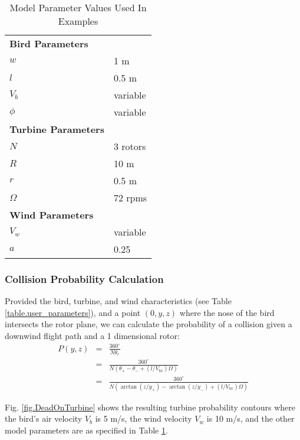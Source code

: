 \documentclass[10pt,conference]{IEEEtran}
\begin{document}
\begin{table}
  \centering
  \label{table.example_parameters}
  \vspace{1 mm}
  \begin{tabular}{|ll|}
  \hline
  \textbf{Bird Parameters} &\\
  $w$ & 1 m\\
  $l$ & 0.5 m\\
  $V_b$ & variable\\
  $\phi$ & variable\\
  \hline
  \textbf{Turbine Parameters} & \\
  $N$ & 3 rotors\\
  $R$ & 10 m\\
  $r$ & 0.5 m\\
  $\Omega$ & 72 rpms\\
  \hline
  \textbf{Wind Parameters} &\\
  $V_w$ & variable\\
  $a$ & 0.25\\
  \hline
  \end{tabular}
  \caption{Model Parameter Values Used In Examples}
\end{table}

\subsubsection{Collision Probability Calculation}
Provided the bird, turbine, and wind characteristics (see Table \ref{table.user_parameters}), and a point $(0,y,z)$
where the nose of the bird intersects the rotor plane, we can calculate the probability of a collision given a downwind
flight path and a 1 dimensional rotor:
\begin{eqnarray}\label{DownwindProbability}
    \nonumber P(y,z) &=& \frac{360^\circ}{N\theta_r}\\
    &=& \frac{360^\circ}{N(\theta_+ - \theta_- + (l/V_{bx})\Omega)}\\
    \nonumber &=& \frac{360^\circ}{N(\arctan(z/y_+) - \arctan(z/y_-) + (l/V_{bx})\Omega)}
\end{eqnarray}

Fig. \ref{fig.DeadOnTurbine} shows the resulting turbine probability contours where the bird's air velocity $V_b$ is 5
m/s, the wind velocity $V_w$ is 10 m/s, and the other model parameters are as specified in Table
\ref{table.example_parameters}.
\end{document}
